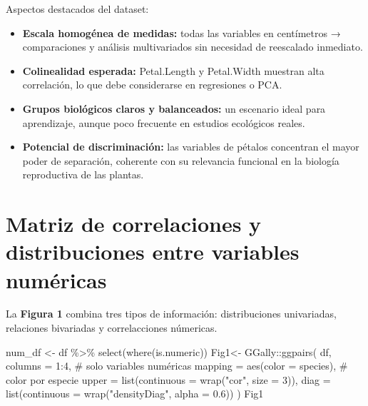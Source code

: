 \documentclass[
  spanish,
  11pt,
  a4paper,
  DIV=11,
  numbers=noendperiod]{scrartcl}
\newenvironment{Shaded}{\begin{snugshade}}{\end{snugshade}}
\newcommand{\AttributeTok}[1]{\textcolor[rgb]{0.40,0.45,0.13}{#1}}
\newcommand{\CommentTok}[1]{\textcolor[rgb]{0.37,0.37,0.37}{#1}}
\newcommand{\DecValTok}[1]{\textcolor[rgb]{0.68,0.00,0.00}{#1}}
\newcommand{\FloatTok}[1]{\textcolor[rgb]{0.68,0.00,0.00}{#1}}
\newcommand{\FunctionTok}[1]{\textcolor[rgb]{0.28,0.35,0.67}{#1}}
\newcommand{\NormalTok}[1]{\textcolor[rgb]{0.00,0.23,0.31}{#1}}
\newcommand{\OtherTok}[1]{\textcolor[rgb]{0.00,0.23,0.31}{#1}}
\newcommand{\SpecialCharTok}[1]{\textcolor[rgb]{0.37,0.37,0.37}{#1}}
\newcommand{\StringTok}[1]{\textcolor[rgb]{0.13,0.47,0.30}{#1}}
\begin{document}
Aspectos destacados del dataset:

\begin{itemize}
\item
  \textbf{Escala homogénea de medidas:} todas las variables en
  centímetros → comparaciones y análisis multivariados sin necesidad de
  reescalado inmediato.
\item
  \textbf{Colinealidad esperada:} Petal.Length y Petal.Width muestran
  alta correlación, lo que debe considerarse en regresiones o PCA.
\item
  \textbf{Grupos biológicos claros y balanceados:} un escenario ideal
  para aprendizaje, aunque poco frecuente en estudios ecológicos reales.
\item
  \textbf{Potencial de discriminación:} las variables de pétalos
  concentran el mayor poder de separación, coherente con su relevancia
  funcional en la biología reproductiva de las plantas.
\end{itemize}

\section{Matriz de correlaciones y distribuciones entre variables
numéricas}\label{matriz-de-correlaciones-y-distribuciones-entre-variables-numuxe9ricas}

La \textbf{Figura 1} combina tres tipos de información: distribuciones
univariadas, relaciones bivariadas y correlacciones númericas.

\begin{Shaded}
\begin{Highlighting}[numbers=left,,]
\NormalTok{num\_df }\OtherTok{\textless{}{-}}\NormalTok{ df }\SpecialCharTok{\%\textgreater{}\%} \FunctionTok{select}\NormalTok{(}\FunctionTok{where}\NormalTok{(is.numeric))}
\NormalTok{Fig1}\OtherTok{\textless{}{-}}\NormalTok{ GGally}\SpecialCharTok{::}\FunctionTok{ggpairs}\NormalTok{(}
\NormalTok{  df,}
  \AttributeTok{columns =} \DecValTok{1}\SpecialCharTok{:}\DecValTok{4}\NormalTok{, }\CommentTok{\# solo variables numéricas}
  \AttributeTok{mapping =} \FunctionTok{aes}\NormalTok{(}\AttributeTok{color =}\NormalTok{ species), }\CommentTok{\# color por especie}
  \AttributeTok{upper =} \FunctionTok{list}\NormalTok{(}\AttributeTok{continuous =} \FunctionTok{wrap}\NormalTok{(}\StringTok{"cor"}\NormalTok{, }\AttributeTok{size =} \DecValTok{3}\NormalTok{)),}
  \AttributeTok{diag =} \FunctionTok{list}\NormalTok{(}\AttributeTok{continuous =} \FunctionTok{wrap}\NormalTok{(}\StringTok{"densityDiag"}\NormalTok{, }\AttributeTok{alpha =} \FloatTok{0.6}\NormalTok{))}
\NormalTok{)}
\NormalTok{Fig1}
\end{Highlighting}
\end{Shaded}
\end{document}

